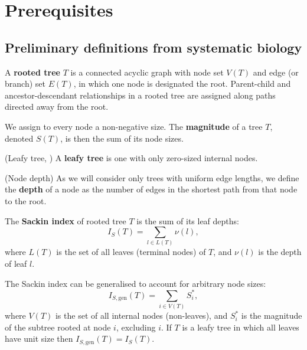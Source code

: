 \section{Prerequisites}


\subsection{Preliminary definitions from systematic biology}\label{defsec}

\begin{definition}
    A \textbf{rooted tree} $T$ is a connected acyclic graph with node set $V(T)$
    and edge (or branch) set $E(T)$, in which one node is designated the root.
    Parent-child and ancestor-descendant relationships in a rooted tree are
    assigned along paths directed away from the root.
\end{definition}

\begin{definition}
    We assign to every node a non-negative size. The \textbf{magnitude} of a
    tree $T$, denoted $S(T)$, is then the sum of its node sizes.
\end{definition}

\begin{definition}(Leafy tree, \citet{lemant_robust_2022})
    A \textbf{leafy tree} is one with only zero-sized internal nodes.
\end{definition}

\begin{definition}(Node depth)
    As we will consider only trees with uniform edge lengths, we define the
    \textbf{depth} of a node as the number of edges in the shortest path from
    that node to the root.
\end{definition}

\begin{definition}
    The \textbf{Sackin index} of rooted tree $T$ is the sum of its leaf depths:
    \begin{equation}\label{sackindef}
        I_S(T) = \sum_{l\in L(T)} \nu(l),
    \end{equation}
    where $L(T)$ is the set of all leaves (terminal nodes) of $T$, and $\nu(l)$
    is the depth of leaf $l$.
\end{definition}

\begin{definition}
    The Sackin index can be generalised to account for arbitrary node sizes:
    \begin{equation}\label{gensackindef}
        I_{S,\text{gen}}(T) = \sum_{i\in V(T)} S_i^*,
    \end{equation}
    where $V(T)$ is the set of all internal nodes (non-leaves), and $S_i^*$ is
    the magnitude of the subtree rooted at node $i$, excluding $i$. If $T$ is a
    leafy tree in which all leaves have unit size then
    $I_{S,\text{gen}}(T) = I_S(T)$.
\end{definition}

